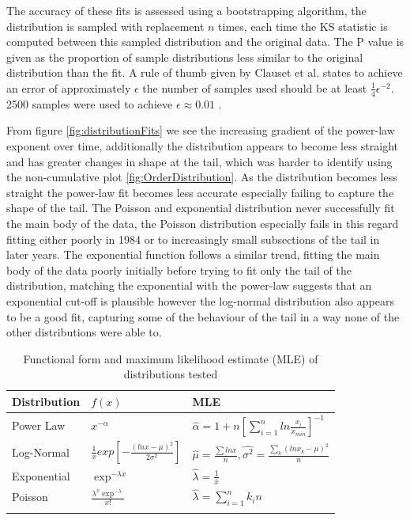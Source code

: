 The accuracy of these fits is assessed using a bootstrapping algorithm, the distribution is sampled with replacement $n$ times, each time the KS statistic is computed between this sampled distribution and the original data. The P value is given as the proportion of sample distributions less similar to the original distribution than the fit. A rule of thumb given by Clauset et al. states to achieve an error of approximately $\epsilon$ the number of samples used should be at least $\frac{1}{4}\epsilon^{-2}$. 2500 samples were used to achieve $\epsilon \approx 0.01$ \cite{clauset2009power}. 

From figure \ref{fig:distributionFits} we see the increasing gradient of the power-law exponent over time, additionally the distribution appears to become less straight and has greater changes in shape at the tail, which was harder to identify using the non-cumulative plot \ref{fig:OrderDistribution}. As the distribution becomes less straight the power-law fit becomes less accurate especially failing to capture the shape of the tail. The Poisson and exponential distribution never successfully fit the main body of the data, the Poisson distribution especially fails in this regard fitting either poorly in 1984 or to increasingly small subsections of the tail in later years. The exponential function follows a similar trend, fitting the main body of the data poorly initially before trying to fit only the tail of the distribution, matching the exponential with the power-law suggests that an exponential cut-off is plausible however the log-normal distribution also appears to be a good fit, capturing some of the behaviour of the tail in a way none of the other distributions were able to. 

\begin{table}
\caption{Functional form and maximum likelihood estimate (MLE) of distributions tested}
\label{tab:distributions}
\centering
\begin{tabular}{l l l}
\toprule
Distribution & $f(x)$ & MLE\\
\midrule
Power Law & $ x^{-\alpha}$ & $ \hat{\alpha} = 1 + n[\sum^n_{i=1}ln\frac{x_i}{x_{min}}]^{-1} $ \\
Log-Normal & $\frac{1}{x}exp[-\frac{(lnx-\mu)^2}{2\sigma^2}] $  & $ \hat{\mu} = \frac{\sum lnx}{n}, \hat{\sigma^2} = \frac{\sum_k(lnx_k - \mu)^2}{n} $ \\
Exponential & $ \exp^{-\lambda x}$  & $\hat{\lambda} = \frac{1}{\bar{x}} $ \\
Poisson & $ \frac{\lambda^x\exp^{-\lambda}}{x!}$ & $\hat{\lambda} = {\sum^n_{i=1}k_i}{n} $ \\ 
\bottomrule\\
\end{tabular}
\end{table}

